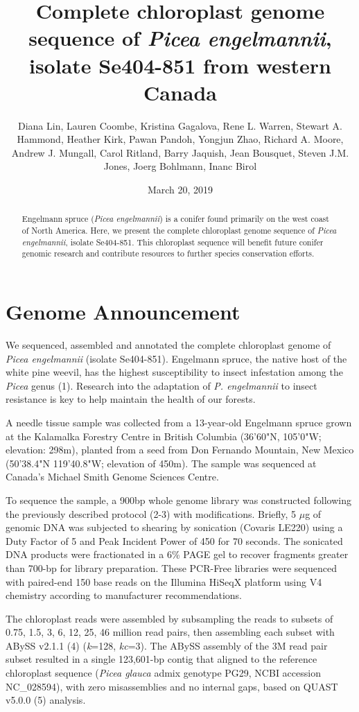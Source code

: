 \documentclass[titlepage,11pt, oneside]{article}   	%
\title{\textbf{Complete chloroplast genome sequence of \textit{Picea engelmannii}, isolate Se404-851 from western Canada\newline}}
\author{Diana Lin, Lauren Coombe, Kristina Gagalova, Rene L. Warren, Stewart A. Hammond, Heather Kirk, Pawan Pandoh, Yongjun Zhao, Richard A. Moore, Andrew J. Mungall, Carol Ritland, Barry Jaquish, Jean Bousquet, Steven J.M. Jones, Joerg Bohlmann, Inanc Birol\newline}
\date{March 20, 2019}
\makeatletter
\renewcommand{\maketitle}{\bgroup\setlength{\parindent}{0pt}
\begin{flushleft}
  \textbf{\@title}

  \@author
\end{flushleft}\egroup
}
\makeatother
\begin{document}
\maketitle
\begin{abstract}
Engelmann spruce (\textit{Picea engelmannii}) is a conifer found primarily on the west coast of North America. Here, we present the complete chloroplast genome sequence of \textit{Picea engelmannii}, isolate Se404-851. This chloroplast sequence will benefit future conifer genomic research and contribute resources to further species conservation efforts.
\end{abstract}

\section*{Genome Announcement}
We sequenced, assembled and annotated the complete chloroplast genome of \textit{Picea engelmannii} (isolate Se404-851). Engelmann spruce, the native host of the white pine weevil, has the highest susceptibility to insect infestation among the \textit{Picea} genus (1). Research into the adaptation of \textit{P. engelmannii} to insect resistance is key to help maintain the health of our forests.
\newline
\par
A needle tissue sample was collected from a 13-year-old Engelmann spruce grown at the Kalamalka Forestry Centre in British Columbia (36'60"N, 105'0"W; elevation: 298m), planted from a seed from Don Fernando Mountain, New Mexico (50'38.4"N 119'40.8"W; elevation of 450m). The sample was sequenced at Canada’s Michael Smith Genome Sciences Centre.
\newline
\par
To sequence the sample, a 900bp whole genome library was constructed following the previously described protocol (2-3) with modifications. Briefly, 5 $\mu$g of genomic DNA was subjected to shearing by sonication (Covaris LE220) using a Duty Factor of 5 and Peak Incident Power of 450 for 70 seconds.  The sonicated DNA products were fractionated in a 6\% PAGE gel to recover fragments greater than 700-bp for library preparation. These PCR-Free libraries were sequenced with paired-end 150 base reads on the Illumina HiSeqX platform using V4 chemistry according to manufacturer recommendations.
\newline
\par
The chloroplast reads were assembled by subsampling the reads to subsets of 0.75, 1.5, 3, 6, 12, 25, 46 million read pairs, then assembling each subset with ABySS v2.1.1 (4) (\textit{k}=128, \textit{kc}=3). The ABySS assembly of the 3M read pair subset resulted in a single 123,601-bp contig that aligned to the reference chloroplast sequence (\textit{Picea glauca} admix genotype PG29, NCBI accession NC\_028594), with zero misassemblies and no internal gaps, based on QUAST v5.0.0 (5) analysis.
\end{document}
